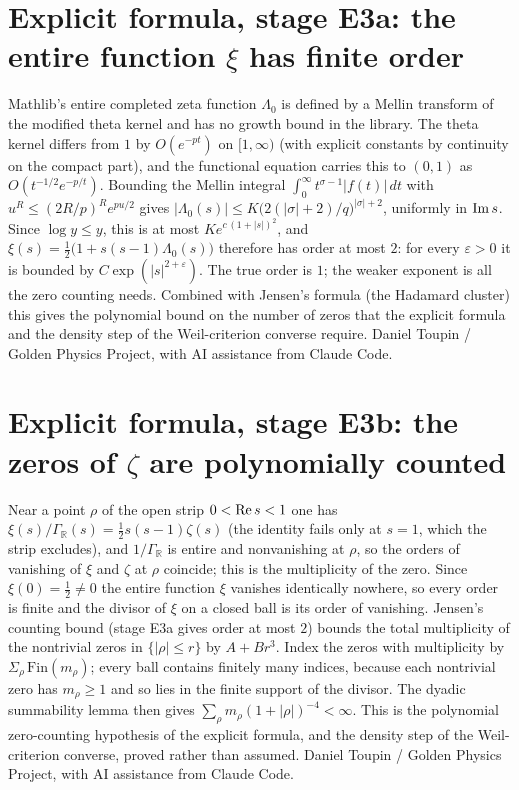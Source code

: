 \documentclass{report}
\theoremstyle{definition}
\begin{document}
\begin{itemize}
\begin{itemize}
\section{Explicit formula, stage E3a: the entire function $\xi$ has finite order}
Mathlib's entire completed zeta function $\Lambda_0$ is defined by a Mellin transform of the modified theta kernel and has no growth bound in the library. The theta kernel differs from $1$ by $O(e^{-pt})$ on $[1,\infty)$ (with explicit constants by continuity on the compact part), and the functional equation carries this to $(0,1)$ as $O(t^{-1/2}e^{-p/t})$. Bounding the Mellin integral $\int_0^\infty t^{\sigma-1}|f(t)|\,dt$ with $u^R\le(2R/p)^Re^{pu/2}$ gives $|\Lambda_0(s)|\le K\bigl(2(|\sigma|+2)/q\bigr)^{|\sigma|+2}$, uniformly in ${\rm Im}\,s$. Since $\log y\le y$, this is at most $K e^{c\,(1+|s|)^2}$, and $\xi(s)=\tfrac12\bigl(1+s(s-1)\Lambda_0(s)\bigr)$ therefore has order at most $2$: for every $\varepsilon>0$ it is bounded by $C\exp(|s|^{2+\varepsilon})$. The true order is $1$; the weaker exponent is all the zero counting needs. Combined with Jensen's formula (the Hadamard cluster) this gives the polynomial bound on the number of zeros that the explicit formula and the density step of the Weil-criterion converse require.
Daniel Toupin / Golden Physics Project, with AI assistance from Claude Code.

\section{Explicit formula, stage E3b: the zeros of $\zeta$ are polynomially counted}
Near a point $\rho$ of the open strip $0<{\rm Re}\,s<1$ one has $\xi(s)/\Gamma_{\mathbb R}(s)=\tfrac12 s(s-1)\zeta(s)$ (the identity fails only at $s=1$, which the strip excludes), and $1/\Gamma_{\mathbb R}$ is entire and nonvanishing at $\rho$, so the orders of vanishing of $\xi$ and $\zeta$ at $\rho$ coincide; this is the multiplicity of the zero. Since $\xi(0)=\tfrac12\ne0$ the entire function $\xi$ vanishes identically nowhere, so every order is finite and the divisor of $\xi$ on a closed ball is its order of vanishing. Jensen's counting bound (stage E3a gives order at most $2$) bounds the total multiplicity of the nontrivial zeros in $\{|\rho|\le r\}$ by $A+Br^{3}$. Index the zeros with multiplicity by $\Sigma_{\rho}\,\mathrm{Fin}(m_\rho)$; every ball contains finitely many indices, because each nontrivial zero has $m_\rho\ge1$ and so lies in the finite support of the divisor. The dyadic summability lemma then gives $\sum_\rho m_\rho(1+|\rho|)^{-4}<\infty$. This is the polynomial zero-counting hypothesis of the explicit formula, and the density step of the Weil-criterion converse, proved rather than assumed.
Daniel Toupin / Golden Physics Project, with AI assistance from Claude Code.



\end{itemize}
\end{itemize}
\end{document}
